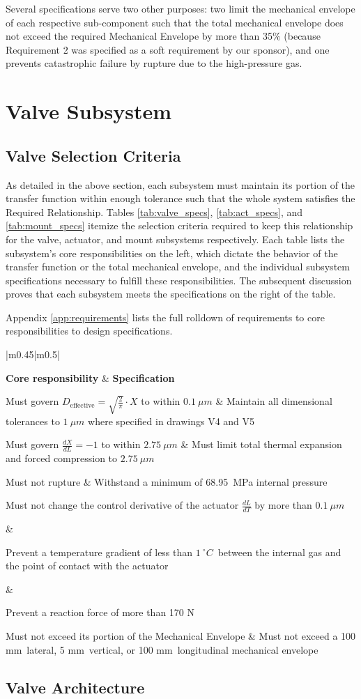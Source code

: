 \documentclass[12pt, letterpaper]{report}%
\newcounter{mycounter}           %
\newcounter{sub}[mycounter]      %
\newcommand{\degC}{^{\circ}C}    %
\newcommand{\specPressure}{68.95}%
\newcommand{\dDdXTol}{$0.1\ \mu m$}
\newcommand{\dXdLTol}{$2.75\ \mu m$}
\newcommand{\dLdTTolValve}{$0.1\ \mu m$}
\newcommand{\dTTol}{$1\ \degC$}
\newcommand{\FTolValve}{170 N}
\newcommand{\valveMEX}{100 mm}
\newcommand{\valveMEY}{5 mm}
\newcommand{\valveMEZ}{100 mm}
\newcommand{\valveSpecs}
{%
    \renewcommand{\arraystretch}{1.4}
    \begin{tabular}{|m{0.45\textwidth}|m{0.5\textwidth}|}

        \hline

            \textbf{Core responsibility}
                & 
            \textbf{Specification} \\ 
            
        \hline

        \vspace{0pt}
            Must govern
            $D_{\text{effective}} = \sqrt{\frac{2}{\pi}} \cdot X$
            to within \dDdXTol
                &
            Maintain all dimensional tolerances to $1\ \mu m$ where specified in drawings V4 and V5 \\
            
        \hline

        \vspace{0pt}
            Must govern
            $\frac{dX}{dL} = -1$
            to within \dXdLTol
                &
            Must limit total thermal expansion and forced compression to \dXdLTol \\
            
        \hline

            Must not rupture
                &
            Withstand a minimum of \specPressure\ MPa internal pressure \\
            
        \hline

            \multirow[c]{2}{0.45\textwidth}
                {%
                    Must not change the control derivative
                    of the actuator $\frac{dL}{dT}$
                    by more than \dLdTTolValve%
                }

                    &

            \rule{0pt}{1.5em}
                Prevent a temperature gradient of less than \dTTol\ between the internal gas and the point of contact with the actuator \\
            \cline{2-2}
        
                    &
        
            \rule{0pt}{2.5em}Prevent a reaction force of more than \FTolValve \\
            
        \hline

            Must not exceed its portion of the Mechanical Envelope
                &
            Must not exceed a \valveMEX\ lateral, \valveMEY\ vertical, or \valveMEZ\ longitudinal mechanical envelope \\

        \hline

    \end{tabular}
}
\begin{document}
        Several specifications serve two other purposes: two limit the mechanical envelope of each respective sub-component
        such that the total mechanical envelope does not exceed the required Mechanical Envelope by more than 35$\%$ 
        (because Requirement 2 was specified as a soft requirement by our sponsor),
        and one prevents catastrophic failure by rupture due to the high-pressure gas.
 


    \section{Valve Subsystem}
    \label{sec:valve_sub_description}

        \subsection{Valve Selection Criteria}
        \label{subsec:valve_sel_crit}

            As detailed in the above section, each subsystem must maintain its portion of the transfer function within enough tolerance such that the whole system satisfies the Required Relationship.
            Tables \ref{tab:valve_specs}, \ref{tab:act_specs}, and \ref{tab:mount_specs} itemize the selection criteria required to keep this relationship for the valve, actuator, and mount subsystems respectively.
            Each table lists the subsystem's core responsibilities on the left, which dictate the behavior of the transfer function or the total mechanical envelope,
            and the individual subsystem specifications necessary to fulfill these responsibilities. The subsequent discussion proves that each subsystem meets the specifications on the right of the table.

            Appendix \ref{app:requirements} lists the full rolldown of requirements to core responsibilities to design specifications.

            \begin{table}[H]
                \centering
                \caption{Valve Selection Criteria}
                \valveSpecs
                \label{tab:valve_specs}
            \end{table}

        \subsection{Valve Architecture}
        \label{subsec:valve_architecture}
\end{document}
